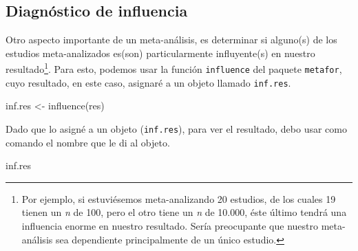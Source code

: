 \documentclass[
  bookmarksnumbered]{article}
\newenvironment{Shaded}{\begin{snugshade}}{\end{snugshade}}
\newcommand{\FunctionTok}[1]{\textcolor[rgb]{0.39,0.29,0.61}{#1}}
\newcommand{\NormalTok}[1]{\textcolor[rgb]{0.12,0.11,0.11}{#1}}
\newcommand{\OtherTok}[1]{\textcolor[rgb]{0.00,0.43,0.16}{#1}}
\begin{document}
\hypertarget{diagnuxf3stico-de-influencia}{%
\subsection{Diagnóstico de influencia}\label{diagnuxf3stico-de-influencia}}

Otro aspecto importante de un meta-análisis, es determinar si alguno(s) de los estudios meta-analizados es(son) particularmente influyente(s) en nuestro resultado\footnote{Por ejemplo, si estuviésemos meta-analizando 20 estudios, de los cuales 19 tienen un \emph{n} de 100, pero el otro tiene un \emph{n} de 10.000, éste último tendrá una influencia enorme en nuestro resultado. Sería preocupante que nuestro meta-análisis sea dependiente principalmente de un único estudio.}. Para esto, podemos usar la función \texttt{influence} del paquete \texttt{metafor}, cuyo resultado, en este caso, asignaré a un objeto llamado \texttt{inf.res}.

\begin{Shaded}
\begin{Highlighting}[]
\NormalTok{inf.res }\OtherTok{\textless{}{-}} \FunctionTok{influence}\NormalTok{(res)}
\end{Highlighting}
\end{Shaded}

Dado que lo asigné a un objeto (\texttt{inf.res}), para ver el resultado, debo usar como comando el nombre que le di al objeto.

\begin{Shaded}
\begin{Highlighting}[]
\NormalTok{inf.res}
\end{Highlighting}
\end{Shaded}
\end{document}
